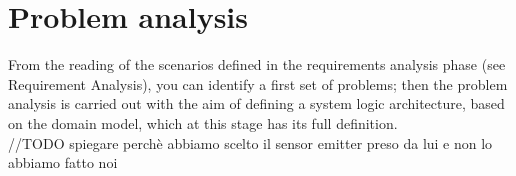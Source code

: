 \section{Problem analysis}
From the reading of the scenarios defined in the requirements analysis phase (see Requirement Analysis), you can identify a first set of problems; then the problem analysis is carried out with the aim of defining a system logic architecture, based on the domain model, which at this stage has its full definition.
\\//TODO spiegare perchè abbiamo scelto il sensor emitter preso da lui e non lo abbiamo fatto noi


